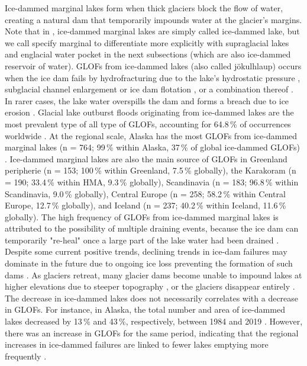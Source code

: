 Ice-dammed marginal lakes form when thick glaciers block the flow of water, creating a natural dam that temporarily impounds water at the glacier's margins. Note that in \cite{Lutzow&al2023,Zhang&al2024}, ice-dammed marginal lakes are simply called ice-dammed lake, but we call specify marginal to differentiate more explicitly with supraglacial lakes and englacial water pocket in the next subsections (which are also ice-dammed reservoir of water). GLOFs from ice-dammed lakes (also called jökulhlaup) occurs when the ice dam fails by hydrofracturing due to the lake's hydrostatic pressure \citep[e.g.][]{Lindner&al2020}, subglacial channel enlargement \citep{Nye1976} or ice dam flotation \citep[e.g.][]{Bjornsson&al1996}, or a combination thereof \citep{Flowers&al2004}. In rarer cases, the lake water overspills the dam and forms a breach due to ice erosion \citep[e.g.][]{Walder&Costa1996,Raymond&Nolan2000,Mayer&Schuler2005}. Glacial lake outburst floods originating from ice-dammed lakes are the most prevalent type of all type of GLOFs, accounting for 64.8\,\% of occurrences worldwide \cite{Lutzow&al2023}. At the regional scale, Alaska has the most GLOFs from ice-dammed marginal lakes (n = 764; 99\,\% within Alaska, 37\,\% of global ice-dammed GLOFs) \citep{Emmer&al2022}. Ice-dammed marginal lakes are also the main source of GLOFs in Greenland peripherie (n = 153; 100\,\% within Greenland, 7.5\,\% globally), the Karakoram (n = 190; 33.4\,\% within HMA, 9.3\,\% globally), Scandinavia (n = 183; 96.8\,\% within Scandinavia, 9.0\,\% globally), Central Europe (n = 258; 58.2\,\% within Central Europe, 12.7\,\% globally), and Iceland (n = 237; 40.2\,\% within Iceland, 11.6\,\% globally)\citep{Zhang&al2024}. The high frequency of GLOFs from ice-dammed marginal lakes is attributed to the possibility of multiple draining events, because the ice dam can temporarily "re-heal" once a large part of the lake water had been drained \citep{Zhang&al2024}. Despite some current positive trends, declining trends in ice-dam failures may dominate in the future due to ongoing ice loss preventing the formation of such dams \citep{Rick&al2022}. As glaciers retreat, many glacier dams become unable to impound lakes at higher elevations due to steeper topography \cite{Zhang&al2024}, or the glaciers disappear entirely \citep[e.g.][]{Geertsema&Clague2005,Tweed&Russel1999,Wolf}. The decrease in ice-dammed lakes does not necessarily correlates with a decrease in GLOFs. For instance, in Alaska, the total number and area of ice-dammed lakes decreased by 13\,\% and 43\,\%, respectively, between 1984 and 2019 \citep{Veh&al2022}. However, there was an increase in GLOFs for the same period, indicating that the regional increases in ice-dammed failures are linked to fewer lakes emptying more frequently \citep{Veh&al2022}.


